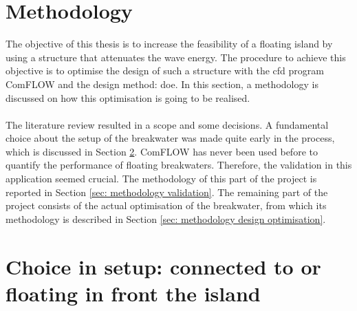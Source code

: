 \section{Methodology}
\label{ch: methodolgy}

The objective of this thesis is to increase the feasibility of a floating island by using a structure that attenuates the wave energy. The procedure to achieve this objective is to optimise the design of such a structure with the \acrfull{cfd} program ComFLOW and the design method: \acrfull{doe}. In this section, a methodology is discussed on how this optimisation is going to be realised. \\
\\
The literature review resulted in a scope and some decisions. A fundamental choice about the setup of the breakwater was made quite early in the process, which is discussed in Section \ref{sec: choice setup}. ComFLOW has never been used before to quantify the performance of floating breakwaters. Therefore, the validation in this application seemed crucial. The methodology of this part of the project is reported in Section \ref{sec: methodology validation}. The remaining part of the project consists of the actual optimisation of the breakwater, from which its methodology is described in Section \ref{sec: methodology design optimisation}. \\



\section{Choice in setup: connected to or floating in front the island}
\label{sec: choice setup}


